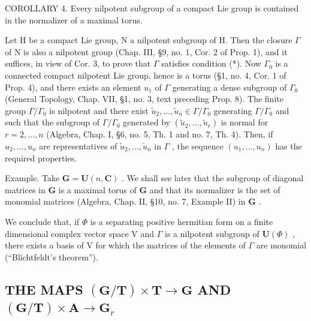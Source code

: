 COROLLARY 4. Every nilpotent subgroup of a compact Lie group is contained in the normalizer of a maximal torus.

Let H be a compact Lie group, N a nilpotent subgroup of H. Then the closure \(\varGamma\) of N is also a nilpotent group (Chap. III, §9, no. 1, Cor. 2 of Prop. 1), and it suffices, in view of Cor. 3, to prove that \(\varGamma\) satisfies condition (*). Now \(\varGamma_{0}\) is a connected compact nilpotent Lie group, hence is a torus (§1, no. 4, Cor. 1 of Prop. 4), and there exists an element \(u_{1}\) of \(\varGamma\) generating a dense subgroup of \(\varGamma_{0}\) (General Topology, Chap. VII, §1, no. 3, text preceding Prop. 8). The finite group \(\varGamma/\varGamma_{0}\) is nilpotent and there exist \(\tilde{u}_{2},\ldots,\tilde{u}_{n}\in\varGamma/\varGamma_{0}\) generating \(\varGamma/\varGamma_{0}\) and such that the subgroup of \(\varGamma/\varGamma_{0}\) generated by \((\tilde{u}_{2},\ldots,\tilde{u}_{r})\) is normal for \(r=2,\ldots,n\) (Algebra, Chap. I, §6, no. 5, Th. 1 and no. 7, Th. 4). Then, if \(u_{2},\ldots,u_{n}\) are representatives of \(\tilde{u}_{2},\ldots,\tilde{u}_{n}\) in \(\varGamma\) , the sequence \((u_{1},\ldots,u_{n})\) has the required properties.

Example. Take \(\mathbf{G} = \mathbf{U}(n,\mathbf{C})\) . We shall see later that the subgroup of diagonal matrices in \(\mathbf{G}\) is a maximal torus of \(\mathbf{G}\) and that its normalizer is the set of monomial matrices (Algebra, Chap. II, §10, no. 7, Example II) in \(\mathbf{G}\) .

We conclude that, if \(\Phi\) is a separating positive hermitian form on a finite dimensional complex vector space V and \(\Gamma\) is a nilpotent subgroup of \(\mathbf{U}(\Phi)\) , there exists a basis of V for which the matrices of the elements of \(\Gamma\) are monomial (``Blichtfeldt's theorem'').

\subsection{\texorpdfstring{THE MAPS \((\mathbf{G} / \mathbf{T})\times \mathbf{T}\to \mathbf{G}\) AND \((\mathbf{G} / \mathbf{T})\times \mathbf{A}\rightarrow \mathbf{G}_r\)}{THE MAPS (\textbackslash mathbf\{G\} / \textbackslash mathbf\{T\})\textbackslash times \textbackslash mathbf\{T\}\textbackslash to \textbackslash mathbf\{G\} AND (\textbackslash mathbf\{G\} / \textbackslash mathbf\{T\})\textbackslash times \textbackslash mathbf\{A\}\textbackslash rightarrow \textbackslash mathbf\{G\}\_r}}

